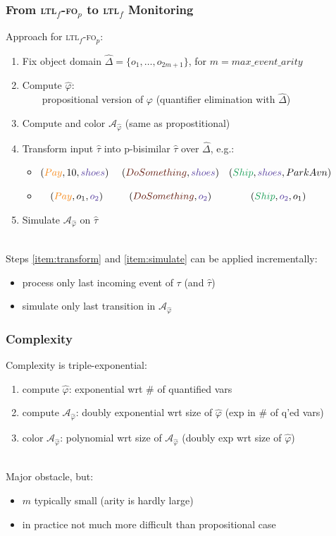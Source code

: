 \documentclass[xcolor=dvipsnames]{beamer}
\newcommand{\A}{\mathcal A\xspace}
\newcommand{\ltlf}{\textsc{ltl}$_f$\xspace}
\newcommand{\ltlffop}{\ltlf-\textsc{fo}$_p$\xspace}
\newcommand{\green}[1]{\textcolor{ForestGreen}{#1}}
\newcommand{\orange}[1]{\textcolor{BurntOrange}{#1}}
\newcommand{\violet}[1]{\textcolor{Violet}{#1}}
\newcommand{\sepia}[1]{\textcolor{Sepia}{#1}}
\begin{document}
\begin{frame}
\frametitle{From \ltlffop to \ltlf Monitoring}

Approach for \ltlffop: 
\begin{enumerate}
	\item Fix object domain $\hat\Delta=\{o_1,\ldots,o_{2m+1}\}$, 	for $m=max\_event\_arity$
	\item Compute $\hat\varphi$:\\ 
		~~~~propositional version of $\varphi$ (quantifier elimination with $\hat\Delta$) 
	\item Compute and color $\A_{\hat\varphi}$ (same as propostitional)
	\item\label{item:transform} Transform input $\hat\tau$ into p-bisimilar $\hat\tau$ over $\hat\Delta$, e.g.:
		\begin{itemize}
			\item $(\orange{Pay},10,\violet{shoes})~~~~(\sepia{DoSomething},\violet{shoes})~~~(\green{Ship},\violet{shoes},Park Avn)$
			\item $~~~(\orange{Pay},o_1,\violet{o_2})~~~~~~~~(\sepia{DoSomething},\violet{o_2})~~~~~~~~~~~~(\green{Ship},\violet{o_2},o_1)$
		\end{itemize}	
	\item\label{item:simulate} Simulate $\A_{\hat\varphi}$ on $\hat\tau$
\end{enumerate}

~\\

Steps \ref{item:transform} and \ref{item:simulate} can be applied incrementally:
\begin{itemize}
	\item process only last incoming event of $\tau$ (and $\hat\tau$)
	\item simulate only last transition in $\A_{\hat\varphi}$
\end{itemize}
\end{frame}


\begin{frame}
\frametitle{Complexity}

Complexity is triple-exponential:
\begin{enumerate}
	\item compute $\hat\varphi$: exponential wrt \# of quantified vars
	\item compute $\A_{\hat\varphi}$: doubly exponential wrt size of $\hat\varphi$ (exp in \# of q'ed vars)
	\item color $\A_{\hat\varphi}$: polynomial wrt size of $\A_{\hat\varphi}$ (doubly exp wrt size of $\hat\varphi$)
\end{enumerate}

~\\

Major obstacle, but:
\begin{itemize}
	\item $m$ typically small (arity is hardly large)
	\item in practice not much more difficult than propositional case
\end{itemize}

\end{frame}
\end{document}
